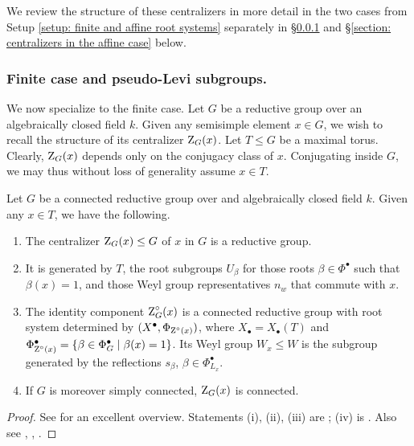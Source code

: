 We review the structure of these centralizers in more detail in the two cases from Setup \ref{setup: finite and affine root systems} separately in \S \ref{section: finite case and pseudo-levi subgroups} and \S \ref{section: centralizers in the affine case} below.





\subsubsection{Finite case and pseudo-Levi subgroups.}\label{section: finite case and pseudo-levi subgroups}
We now specialize to the finite case.
%
Let $G$ be a reductive group over an algebraically closed field $k$. Given any semisimple element $x \in G$, we wish to recall the structure of its centralizer $\operatorname{Z}_{G}(x)$. 
%
Let $T \leq G$ be a maximal torus. Clearly, $\operatorname{Z}_G(x)$ depends only on the conjugacy class of $x$. Conjugating inside $G$, we may thus without loss of generality assume $x \in T$.


\begin{proposition}\label{proposition: pseudo-levi subgroups}
Let $G$ be a connected reductive group over and algebraically closed field $k$. Given any $x \in T$, we have the following.
\begin{enumerate}
    \item[(i)] The centralizer $\operatorname{Z}_{G}(x) \leq G$ of $x$ in $G$ is a reductive group.
    \item[(ii)] It is generated by $T$, the root subgroups $U_{\beta}$ for those roots $\beta \in \Phi^{\bullet}$ such that $\beta(x)=1$, and those Weyl group representatives $n_w$ that commute with $x$.
    \item[(iii)] The identity component $\operatorname{Z}^{\circ}_{G}(x)$ is a connected reductive group with root system determined by $(X^{\bullet}, \Phi_{\operatorname{Z}^{\circ}(x)})$, where $X_{\bullet} = X_{\bullet}(T)$ and $\Phi^{\bullet}_{\operatorname{Z}^{\circ}(x)} = \{ \beta \in \Phi^{\bullet}_G \mid \beta(x)=1\}$. Its Weyl group $W_x \leq W$ is the subgroup generated by the reflections $s_{\beta}$, $\beta \in \Phi^{\bullet}_{L_x}$.   
    \item[(iv)]  If $G$ is moreover simply connected, $\operatorname{Z}_{G}(x)$ is connected.     
\end{enumerate}
\end{proposition}
\begin{proof}
See \cite[\S 2]{Hum95} for an excellent overview. 
Statements (i), (ii), (iii) are \cite[\S 2.2. Theorem]{Hum95}; (iv) is \cite[\S 2.11. Theorem]{Hum95}.
%
Also see \cite[\S 4, \S 5]{Ste68}, \cite[\S 4, in particular \S 4.1 and \S 4.2]{SS70}, \cite[\S 6]{MS03}.
\end{proof}

